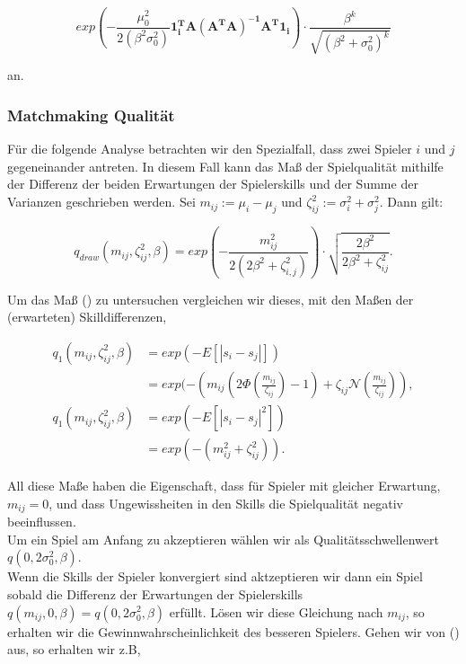 \documentclass[12pt,a4paper]{scrartcl}
\numberwithin{equation}{section}
\begin{document}
  \begin{equation}
   exp(- \frac{\mu_0^2}{2(\beta^2 \sigma_0^2)} \mathbf{1_i^T A (A^T A)^{-1} A^T 1_i}) \cdot \frac{\beta^k}{\sqrt{(\beta^2 + \sigma_0^2)^k}}
  \end{equation}

  an. 
  
  \subsubsection{Matchmaking Qualität}
  
  Für die folgende Analyse betrachten wir den Spezialfall, dass zwei Spieler $i$ und $j$ gegeneinander antreten. In diesem Fall kann das Maß der Spielqualität mithilfe der Differenz
  der beiden Erwartungen der Spielerskills und der Summe der Varianzen geschrieben werden. Sei $m_{ij} := \mu_i - \mu_j$ und $\zeta_{ij}^2 := \sigma_i^2 + \sigma_j^2$. Dann gilt:
  
  \begin{equation}
   q_{draw}(m_{ij}, \zeta_{ij}^2, \beta) = exp(- \frac{m_{ij}^2}{2(2 \beta^2 + \zeta_{i,j}^2)}) \cdot \sqrt{ \frac{2 \beta^2}{2 \beta^2 + \zeta_{ij}^2}}.
  \end{equation}

  Um das Maß () zu untersuchen vergleichen wir dieses, mit den Maßen der (erwarteten) Skilldifferenzen, 
  
  \begin{equation}
   \begin{split}
    q_1(m_{ij}, \zeta_{ij}^2, \beta) &= exp(-E[|s_i-s_j|]) \\
    &= exp(-(m_{ij} ( 2 \Phi(\frac{m_{ij}}{\zeta_{ij}})-1) + \zeta_{ij} \mathcal{N}(\frac{m_{ij}}{\zeta_{ij}})), \\
    q_1(m_{ij}, \zeta_{ij}^2, \beta) &= exp(-E[|s_i-s_j|^2]) \\
    &= exp(- (m_{ij}^2 + \zeta_{ij}^2)).
   \end{split}
  \end{equation}
  
  All diese Maße haben die Eigenschaft, dass für Spieler mit gleicher Erwartung, $m_{ij} = 0$, und dass Ungewissheiten in den Skills die Spielqualität negativ beeinflussen. \\
  Um ein Spiel am Anfang zu akzeptieren wählen wir als Qualitätsschwellenwert $q(0,2 \sigma_0^2, \beta)$. \\
  Wenn die Skills der Spieler konvergiert sind aktzeptieren wir dann ein Spiel sobald die Differenz der Erwartungen der Spielerskills $q(m_{ij},0, \beta) = q(0,2 \sigma_0^2, \beta)$ erfüllt. 
  Lösen wir diese Gleichung nach $m_{ij}$, so erhalten wir die Gewinnwahrscheinlichkeit des besseren Spielers.
  Gehen wir von () aus, so erhalten wir z.B, 
  
\end{document}
